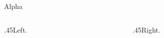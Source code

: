\documentclass[11pt,aspectratio=169]{beamer}
\date{}
\begin{document}
\begin{frame}{Alpha}\begin{columns}[T]\begin{column}{.45\textwidth}Left.\end{column}\begin{column}{.45\textwidth}Right.\end{column}\end{columns}\end{frame}
\end{document}
